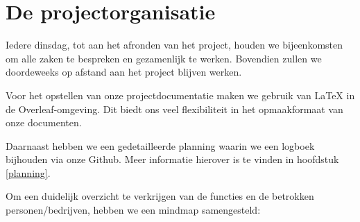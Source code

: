 \section{De projectorganisatie}
Iedere dinsdag, tot aan het afronden van het project, houden we bijeenkomsten om alle zaken te bespreken en gezamenlijk te werken. Bovendien zullen we doordeweeks op afstand aan het project blijven werken.

Voor het opstellen van onze projectdocumentatie maken we gebruik van LaTeX in de Overleaf-omgeving. Dit biedt ons veel flexibiliteit in het opmaakformaat van onze documenten.

Daarnaast hebben we een gedetailleerde planning waarin we een logboek bijhouden via onze Github. Meer informatie hierover is te vinden in hoofdstuk \ref{planning}.

Om een duidelijk overzicht te verkrijgen van de functies en de betrokken personen/bedrijven, hebben we een mindmap samengesteld:
\vspace{1cm} 
\begin{minipage}[t][][b]{\linewidth}
  
\end{minipage}

